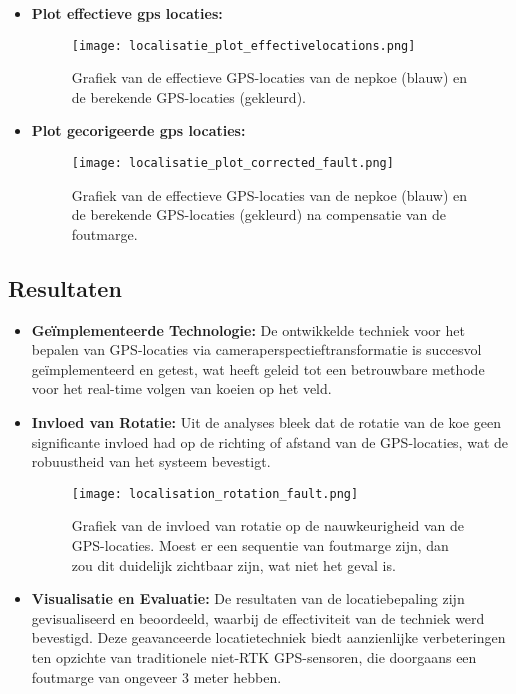 \begin{itemize}
\begin{itemize}
    \newpage
    \item \textbf{Plot effectieve gps locaties:} 
    \newline 
    \begin{figure}[H]
      \centering
      \texttt{[image: localisatie\_plot\_effectivelocations.png]}
      \caption{Grafiek van de effectieve GPS-locaties van de nepkoe (blauw) en de berekende GPS-locaties (gekleurd).}
      \label{fig:localisatie_plot_effectivelocations}  
    \end{figure}
    \newpage
    \item \textbf{Plot gecorigeerde gps locaties:} 
    \newline
    \begin{figure}[H]
      \centering
      \texttt{[image: localisatie\_plot\_corrected\_fault.png]}
      \caption{Grafiek van de effectieve GPS-locaties van de nepkoe (blauw) en de berekende GPS-locaties (gekleurd) na compensatie van de foutmarge.}
      \label{fig:localisatie_plot_corrected_fault}  
    \end{figure}
    \newline 
  \end{itemize}
\end{itemize}

\subsection{Resultaten}
\begin{itemize}
  \item \textbf{Geïmplementeerde Technologie:} De ontwikkelde techniek voor het bepalen van GPS-locaties via cameraperspectieftransformatie is succesvol geïmplementeerd en getest, wat heeft geleid tot een betrouwbare methode voor het real-time volgen van koeien op het veld.
  \item \textbf{Invloed van Rotatie:} Uit de analyses bleek dat de rotatie van de koe geen significante invloed had op de richting of afstand van de GPS-locaties, wat de robuustheid van het systeem bevestigt. 
  \newline 
  \begin{figure}[H]
    \centering
    \texttt{[image: localisation\_rotation\_fault.png]}
    \caption{Grafiek van de invloed van rotatie op de nauwkeurigheid van de GPS-locaties. Moest er een sequentie van foutmarge zijn, dan zou dit duidelijk zichtbaar zijn, wat niet het geval is.}
    \label{fig:localisatie_rotation_fault}  
  \end{figure}
  \newline
  \item \textbf{Visualisatie en Evaluatie:} De resultaten van de locatiebepaling zijn gevisualiseerd en beoordeeld, waarbij de effectiviteit van de techniek werd bevestigd. Deze geavanceerde locatietechniek biedt aanzienlijke verbeteringen ten opzichte van traditionele niet-RTK GPS-sensoren, die doorgaans een foutmarge van ongeveer 3 meter hebben.
\end{itemize}